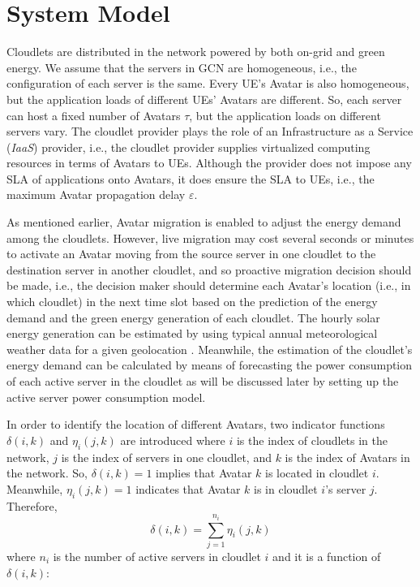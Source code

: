 \documentclass[journal,12pt,draftclsnofoot,onecolumn]{IEEEtran}
\begin{document}
\section{System Model}

Cloudlets are distributed in the network powered by both on-grid and green energy. We assume that the servers in GCN are homogeneous, i.e., the configuration of each server is the same. Every UE's Avatar is also homogeneous, but the application loads of different UEs' Avatars are different. So, each server can host a fixed number of Avatars $\tau$, but the application loads on different servers vary. The cloudlet provider plays the role of an Infrastructure as a Service (\emph{IaaS}) provider, i.e., the cloudlet provider supplies virtualized computing resources in terms of Avatars to UEs. Although the provider does not impose any SLA of applications onto Avatars, it does ensure the SLA to UEs, i.e., the maximum Avatar propagation delay $\varepsilon$.\

As mentioned earlier, Avatar migration is enabled to adjust the energy demand among the cloudlets. However, live migration may cost several seconds or minutes to activate an Avatar moving from the source server in one cloudlet to the destination server in another cloudlet, and so proactive migration decision should be made, i.e., the decision maker should determine each Avatar's location (i.e., in which cloudlet) in the next time slot based on the prediction of the energy demand and the green energy generation of each cloudlet. The hourly solar energy generation can be estimated by using typical annual meteorological weather data for a given geolocation \cite{18}. Meanwhile, the estimation of the cloudlet's energy demand can be calculated by means of forecasting the power consumption of each active server in the cloudlet as will be discussed later by setting up the active server power consumption model. \

In order to identify the location of different Avatars, two indicator functions $\delta(i,k)$ and $\eta_i(j,k)$ are introduced where $i$ is the index of cloudlets in the network, $j$ is the index of servers in one cloudlet, and $k$ is the index of Avatars in the network. So, $\delta(i,k)=1$ implies that Avatar $k$ is located in cloudlet $i$. Meanwhile, $\eta_i(j,k)=1$ indicates that Avatar $k$ is in cloudlet $i$'s server $j$. Therefore,
\begin{equation}
\delta \left( i,k \right)=\sum\limits_{j=1}^{{{n}_{i}}}{{{\eta }_{i}}\left( j,k \right)}														
\end{equation}
where $n_i$ is the number of active servers in cloudlet $i$ and it is a function of $\delta(i,k)$:
\end{document}

